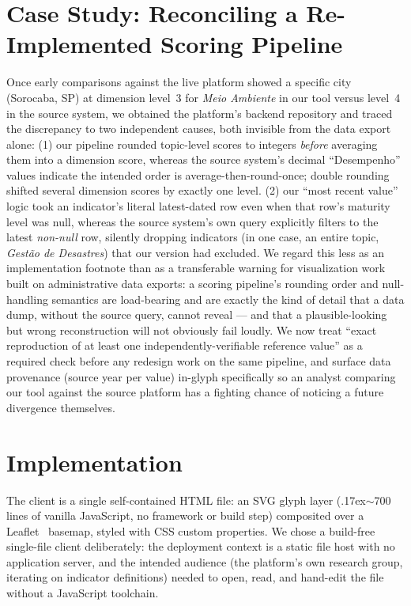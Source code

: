 \documentclass[10pt,twocolumn]{article}
\begin{document}
\section{Case Study: Reconciling a Re-Implemented Scoring Pipeline}
\label{sec:case}
Once early comparisons against the live platform showed a specific city (Sorocaba, SP) at dimension level~3 for \emph{Meio Ambiente} in our tool versus level~4 in the source system, we obtained the platform's backend repository and traced the discrepancy to two independent causes, both invisible from the data export alone: (1) our pipeline rounded topic-level scores to integers \emph{before} averaging them into a dimension score, whereas the source system's decimal ``Desempenho'' values indicate the intended order is average-then-round-once; double rounding shifted several dimension scores by exactly one level. (2) our ``most recent value'' logic took an indicator's literal latest-dated row even when that row's maturity level was null, whereas the source system's own query explicitly filters to the latest \emph{non-null} row, silently dropping indicators (in one case, an entire topic, \emph{Gest\~ao de Desastres}) that our version had excluded. We regard this less as an implementation footnote than as a transferable warning for visualization work built on administrative data exports: a scoring pipeline's rounding order and null-handling semantics are load-bearing and are exactly the kind of detail that a data dump, without the source query, cannot reveal — and that a plausible-looking but wrong reconstruction will not obviously fail loudly. We now treat ``exact reproduction of at least one independently-verifiable reference value'' as a required check before any redesign work on the same pipeline, and surface data provenance (source year per value) in-glyph specifically so an analyst comparing our tool against the source platform has a fighting chance of noticing a future divergence themselves.

\section{Implementation}
The client is a single self-contained HTML file: an SVG glyph layer (\raise.17ex\hbox{$\scriptstyle\sim$}700 lines of vanilla JavaScript, no framework or build step) composited over a Leaflet~\cite{leaflet} basemap, styled with CSS custom properties. We chose a build-free single-file client deliberately: the deployment context is a static file host with no application server, and the intended audience (the platform's own research group, iterating on indicator definitions) needed to open, read, and hand-edit the file without a JavaScript toolchain.
\end{document}
